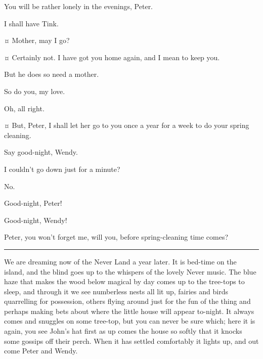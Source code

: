 \begin{drama}
\wendyspeaks
You will be rather lonely in the evenings, Peter.

\peterspeaks
I shall have Tink.

\wendyspeaks {}¤
Mother, may I go?

\mrsdarlingspeaks {}¤
Certainly not.
I have got you home again, and I mean to keep you.

\wendyspeaks
But he does so need a mother.

\mrsdarlingspeaks
So do you, my love.

\peterspeaks
Oh, all right.

\mrsdarlingspeaks {}¤
But, Peter, I shall let her go to you once a year for a week to do your spring cleaning.


\mrsdarlingspeaks
Say good-night, Wendy.

\wendyspeaks
I couldn't go down just for a minute?

\mrsdarlingspeaks
No.

\wendyspeaks
Good-night, Peter!

\peterspeaks
Good-night, Wendy!

\wendyspeaks
Peter, you won't forget me, will you, before spring-cleaning time comes?


\plainbreak{1}

\begin{stagedir}
We are dreaming now of the Never Land a year later.
It is bed-time on the island, and the blind goes up to the whispers of the lovely Never music.
The blue haze that makes the wood below magical by day comes up to the tree-tops to sleep,
and through it we see numberless nests all lit up, fairies and birds quarrelling for possession,
others flying around just for the fun of the thing
and perhaps making bets about where the little house will appear to-night.
It always comes and snuggles on some tree-top, but you can never be sure which;
here it is again, you see John's hat first as up comes the house
so softly that it knocks some gossips off their perch.
When it has settled comfortably it lights up, and out come Peter and Wendy.


\end{stagedir}
\end{drama}
